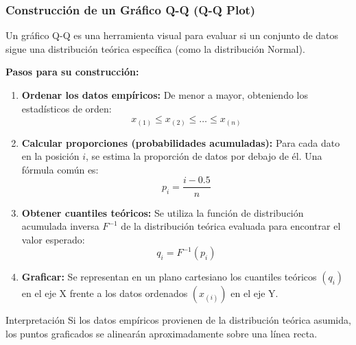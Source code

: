 \documentclass[aspectratio=1610, 10pt]{beamer}
\begin{document}
\begin{frame}
\frametitle{Construcción de un Gráfico Q-Q (Q-Q Plot)}
Un gráfico Q-Q es una herramienta visual para evaluar si un conjunto de datos sigue una distribución teórica específica (como la distribución Normal).

\vspace{0.3cm}
\textbf{Pasos para su construcción:}
\begin{enumerate}
    \item \textbf{Ordenar los datos empíricos:} De menor a mayor, obteniendo los estadísticos de orden: 
    $$x_{(1)} \leq x_{(2)} \leq \dots \leq x_{(n)}$$
    
    \item \textbf{Calcular proporciones (probabilidades acumuladas):} Para cada dato en la posición $i$, se estima la proporción de datos por debajo de él. Una fórmula común es:
    $$p_i = \frac{i - 0.5}{n}$$
    
    \item \textbf{Obtener cuantiles teóricos:} Se utiliza la función de distribución acumulada inversa $F^{-1}$ de la distribución teórica evaluada para encontrar el valor esperado:
    $$q_i = F^{-1}(p_i)$$
    
    \item \textbf{Graficar:} Se representan en un plano cartesiano los cuantiles teóricos $(q_i)$ en el eje X frente a los datos ordenados $(x_{(i)})$ en el eje Y.
\end{enumerate}

\begin{block}{Interpretación}
Si los datos empíricos provienen de la distribución teórica asumida, los puntos graficados se alinearán aproximadamente sobre una línea recta.
\end{block}

\end{frame}
\end{document}
